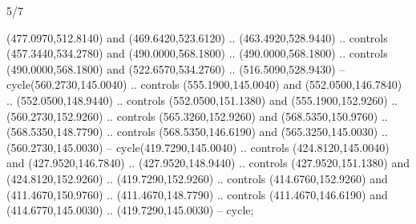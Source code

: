 \begin{flagdescription}{5/7}
\begin{scope}[xshift=0.5\flaglength]
\begin{scope}[scale=0.0019\flagwidth,yshift=190.5mm,xshift=-137.7mm]
\begin{scope}[y=0.80pt, x=0.80pt, yscale=-1, xscale=1, inner sep=0pt, outer sep=0pt]
  (477.0970,512.8140) and (469.6420,523.6120) .. (463.4920,528.9440) .. controls
  (457.3440,534.2780) and (490.0000,568.1800) .. (490.0000,568.1800) .. controls
  (490.0000,568.1800) and (522.6570,534.2760) .. (516.5090,528.9430) --
  cycle(560.2730,145.0040) .. controls (555.1900,145.0040) and
  (552.0500,146.7840) .. (552.0500,148.9440) .. controls (552.0500,151.1380) and
  (555.1900,152.9260) .. (560.2730,152.9260) .. controls (565.3260,152.9260) and
  (568.5350,150.9760) .. (568.5350,148.7790) .. controls (568.5350,146.6190) and
  (565.3250,145.0030) .. (560.2730,145.0030) -- cycle(419.7290,145.0040) ..
  controls (424.8120,145.0040) and (427.9520,146.7840) .. (427.9520,148.9440) ..
  controls (427.9520,151.1380) and (424.8120,152.9260) .. (419.7290,152.9260) ..
  controls (414.6760,152.9260) and (411.4670,150.9760) .. (411.4670,148.7790) ..
  controls (411.4670,146.6190) and (414.6770,145.0030) .. (419.7290,145.0030) --
  cycle;
\end{scope}
\end{scope}
\end{scope}
\fi
\framecode{}
\end{flagdescription}
